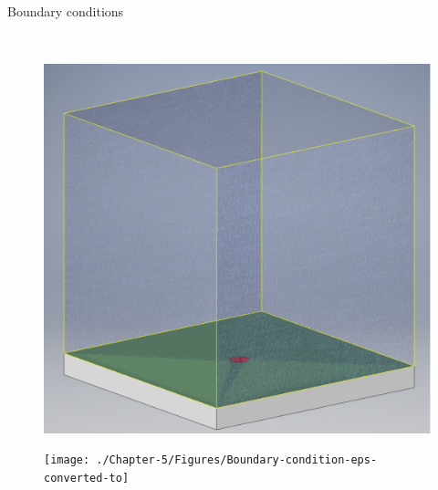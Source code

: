 \documentclass{beamer}
\begin{document}
\begin{frame}{Boundary conditions}
\begin{minipage}{.560\textwidth}
%
\\[20mm]
%
\begin{minipage}{0.49\textwidth}
\begin{figure}[!t]
\centering
\includegraphics[width=.99\textwidth]{./Chapter-2/Figures/Domain_good}
\label{fig:Domain_3D}
\end{figure}
\end{minipage}
\begin{minipage}{0.49\textwidth}
\begin{figure}[!t]
\centering
\texttt{[image: ./Chapter-5/Figures/Boundary-condition-eps-converted-to]}
\end{figure}
\end{minipage}
%
\end{minipage}
%
\end{frame}
\end{document}
